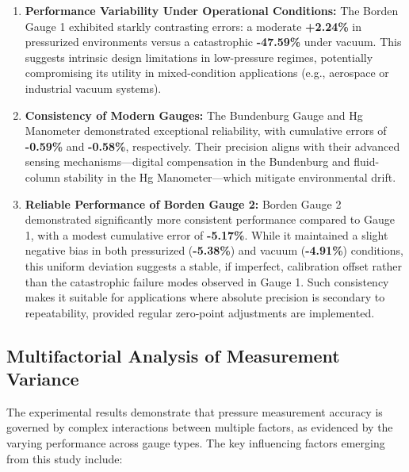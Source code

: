 \documentclass{article}
\begin{document}
\begin{enumerate}  
	\item \textbf{Performance Variability Under Operational Conditions:}  
	The Borden Gauge 1 exhibited starkly contrasting errors: a moderate \textbf{+2.24\%} in pressurized environments versus a catastrophic \textbf{-47.59\%} under vacuum. This suggests intrinsic design limitations in low-pressure regimes, potentially compromising its utility in mixed-condition applications (e.g., aerospace or industrial vacuum systems).  
	
	\item \textbf{Consistency of Modern Gauges:}  
	The Bundenburg Gauge and Hg Manometer demonstrated exceptional reliability, with cumulative errors of \textbf{-0.59\%} and \textbf{-0.58\%}, respectively. Their precision aligns with their advanced sensing mechanisms---digital compensation in the Bundenburg and fluid-column stability in the Hg Manometer—which mitigate environmental drift.  
	
	\item \textbf{Reliable Performance of Borden Gauge 2:}  
	Borden Gauge 2 demonstrated significantly more consistent performance compared to Gauge 1, with a modest cumulative error of \textbf{-5.17\%}. While it maintained a slight negative bias in both pressurized (\textbf{-5.38\%}) and vacuum (\textbf{-4.91\%}) conditions, this uniform deviation suggests a stable, if imperfect, calibration offset rather than the catastrophic failure modes observed in Gauge 1. Such consistency makes it suitable for applications where absolute precision is secondary to repeatability, provided regular zero-point adjustments are implemented.
\end{enumerate}  

\subsection{Multifactorial Analysis of Measurement Variance}
The experimental results demonstrate that pressure measurement accuracy is governed by complex interactions between multiple factors, as evidenced by the varying performance across gauge types. The key influencing factors emerging from this study include:
\end{document}
